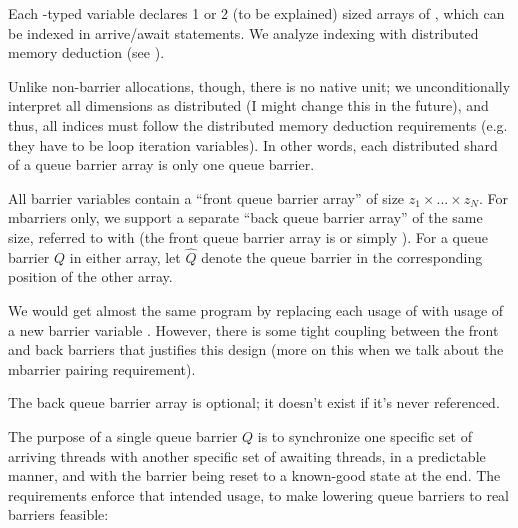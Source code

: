 \filbreak
Each -typed variable declares 1 or 2 (to be explained) sized arrays of , which can be indexed in arrive/await statements. We analyze indexing with distributed memory deduction (see ).



\filbreak
Unlike non-barrier allocations, though, there is no native unit; we unconditionally interpret all dimensions as distributed (I might change this in the future), and thus, all indices must follow the distributed memory deduction requirements (e.g. they have to be  loop iteration variables).
In other words, each distributed shard of a queue barrier array is only one queue barrier.

\filbreak
All barrier variables  contain a ``front queue barrier array'' of size $z_1 \times ... \times z_N$.
For mbarriers only, we support a separate ``back queue barrier array'' of the same size, referred to with  (the front queue barrier array is  or simply ).
For a queue barrier $Q$ in either array, let $\widehat{Q}$ denote the queue barrier in the corresponding position of the other array.

\filbreak
We would get almost the same program by replacing each usage of  with usage of a new barrier variable .
However, there is some tight coupling between the front and back barriers that justifies this design (more on this when we talk about the mbarrier pairing requirement).

\filbreak
The back queue barrier array is optional; it doesn't exist if it's never referenced.

\filbreak
{}

The purpose of a single queue barrier $Q$ is to synchronize one specific set of arriving threads with another specific set of awaiting threads, in a predictable manner, and with the barrier being reset to a known-good state at the end.
The requirements enforce that intended usage, to make lowering queue barriers to real barriers feasible:

